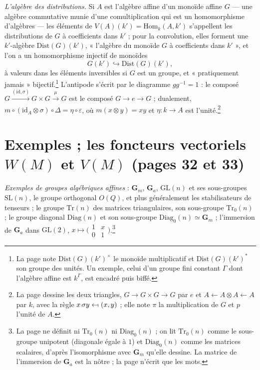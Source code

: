 \documentclass[11pt,a4paper]{article}
\begin{document}
\emph{L'algèbre des distributions.} Si $A$ est l'algèbre affine d'un monoïde
affine $G$ --- une algèbre commutative munie d'une comultiplication qui est
un homomorphisme d'algèbres --- les éléments de
$V(A)(k') = \mathrm{Hom}_{k}(A, k')$ s'appellent les distributions de $G$ à
coefficients dans $k'$ ; pour la convolution, elles forment une $k'$-algèbre
$\mathrm{Dist}(G)(k')$, « l'algèbre du monoïde $G$ à coefficients dans $k'$ »,
et l'on a un homomorphisme injectif de monoïdes
\[
  G(k') \hookrightarrow \mathrm{Dist}(G)(k') ,
\]
à valeurs dans les éléments inversibles si $G$ est un groupe, et
« pratiquement jamais » bijectif.\footnote{La page note
$\mathrm{Dist}(G)(k')^{\times}$ le monoïde multiplicatif et
$\mathrm{Dist}(G)(k')^{*}$ son groupe des unités. Un exemple, celui d'un
groupe fini constant $\Gamma$ dont l'algèbre affine est $k^{\Gamma}$, est
encadré puis biffé.}
L'antipode s'écrit par le diagramme $g g^{-1} = 1$ : le composé
$G \xrightarrow{(\mathrm{id}, \sigma)} G \times G \xrightarrow{\mu} G$ est
le composé $G \to e \to G$ ; dualement,
$m \circ (\mathrm{id}_{A} \otimes \sigma) \circ \Delta = \eta \circ \varepsilon$,
où $m(x \otimes y) = x y$ et $\eta \colon k \to A$ est l'unité.\footnote{La
page dessine les deux triangles, $G \to G \times G \to G$ par $e$ et
$A \leftarrow A \otimes A \leftarrow A$ par $k$, avec la règle
$x \, \sigma y \leftarrow\!\shortmid (x, y)$ ; elle note $\pi$ la
multiplication de $G$ et $p$ l'unité de $A$.}

\section*{Exemples ; les foncteurs vectoriels $W(M)$ et $V(M)$ (pages 32 et 33)}

\emph{Exemples de groupes algébriques affines} : $\mathbf{G}_{m}$,
$\mathbf{G}_{a}$, $\mathrm{GL}(n)$ et ses sous-groupes $\mathrm{SL}(n)$, le
groupe orthogonal $O(Q)$, et plus généralement les stabilisateurs de
tenseurs ; le groupe $\mathrm{Tr}(n)$ des matrices triangulaires, son
sous-groupe $\mathrm{Tr}_{0}(n)$ ; le groupe diagonal $\mathrm{Diag}(n)$ et
son sous-groupe $\mathrm{Diag}_{0}(n) \simeq \mathbf{G}_{m}$ ; l'immersion
de $\mathbf{G}_{a}$ dans $\mathrm{GL}(2)$, $x \mapsto
\bigl(\begin{smallmatrix} 1 & x \\ 0 & 1 \end{smallmatrix}\bigr)$.\footnote{La
page ne définit ni $\mathrm{Tr}_{0}(n)$ ni $\mathrm{Diag}_{0}(n)$ ; on lit
$\mathrm{Tr}_{0}(n)$ comme le sous-groupe unipotent (diagonale égale à $1$)
et $\mathrm{Diag}_{0}(n)$ comme les matrices scalaires, d'après
l'isomorphisme avec $\mathbf{G}_{m}$ qu'elle dessine. La matrice de
l'immersion de $\mathbf{G}_{a}$ est la nôtre ; la page n'écrit que les mots.}
\end{document}
